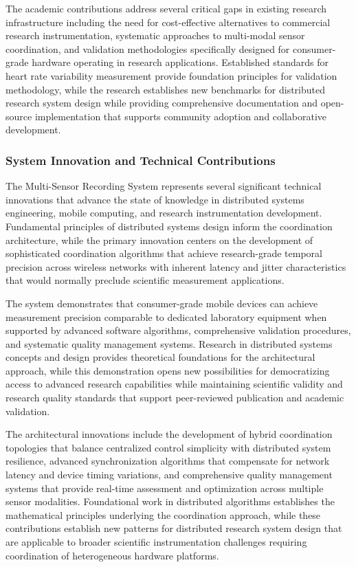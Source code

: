 \documentclass[11pt,a4paper]{report}
\begin{document}
The academic contributions address several critical gaps in existing research infrastructure including the need for
cost-effective alternatives to commercial research instrumentation, systematic approaches to multi-modal sensor
coordination, and validation methodologies specifically designed for consumer-grade hardware operating in research
applications. Established standards for heart rate variability measurement provide foundation principles for validation
methodology, while the research establishes new benchmarks for distributed research system design while providing
comprehensive documentation and open-source implementation that supports community adoption and collaborative
development.

\subsubsection{System Innovation and Technical Contributions}

The Multi-Sensor Recording System represents several significant technical innovations that advance the state of
knowledge in distributed systems engineering, mobile computing, and research instrumentation development. Fundamental
principles of distributed systems design inform the coordination architecture, while the primary innovation centers on
the development of sophisticated coordination algorithms that achieve research-grade temporal precision across wireless
networks with inherent latency and jitter characteristics that would normally preclude scientific measurement
applications.

The system demonstrates that consumer-grade mobile devices can achieve measurement precision comparable to dedicated
laboratory equipment when supported by advanced software algorithms, comprehensive validation procedures, and systematic
quality management systems. Research in distributed systems concepts and design provides theoretical foundations for the
architectural approach, while this demonstration opens new possibilities for democratizing access to advanced research
capabilities while maintaining scientific validity and research quality standards that support peer-reviewed publication
and academic validation.

The architectural innovations include the development of hybrid coordination topologies that balance centralized control
simplicity with distributed system resilience, advanced synchronization algorithms that compensate for network latency
and device timing variations, and comprehensive quality management systems that provide real-time assessment and
optimization across multiple sensor modalities. Foundational work in distributed algorithms establishes the mathematical
principles underlying the coordination approach, while these contributions establish new patterns for distributed
research system design that are applicable to broader scientific instrumentation challenges requiring coordination of
heterogeneous hardware platforms.
\end{document}
